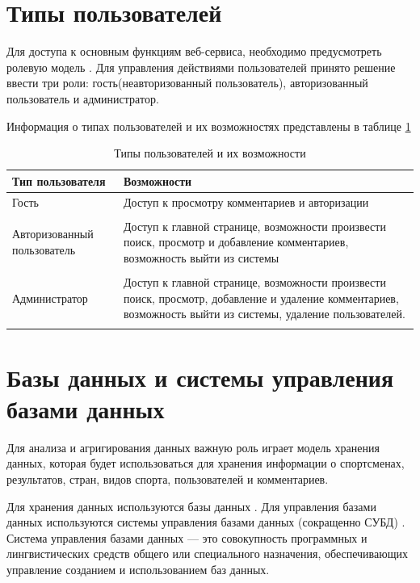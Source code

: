 \newpage
\section{Типы пользователей}

Для доступа к основным функциям веб-сервиса, необходимо предусмотреть ролевую модель \cite{role-m}.
Для управления действиями пользователей принято решение ввести три роли: гость(неавторизованный пользователь), авторизованный пользователь и администратор.


Информация о типах пользователей и их возможностях представлены в таблице \ref{tab:users}

\begin{table}[h!]
	\caption{Типы пользователей и их возможности}
	\label{tab:users}
	\begin{tabular}{ | p{150pt} | p{300pt}  | }
		\hline
	    Тип пользователя & Возможности   \\
	     \hline
		
		Гость & Доступ к просмотру комментариев и авторизации \\
		&   \\ \hline
		
		Авторизованный пользователь & Доступ к главной странице, возможности произвести поиск, просмотр и добавление комментариев, возможность выйти из системы  \\
		&   \\ \hline 
		
		
		Администратор & Доступ к главной странице, возможности произвести поиск, просмотр, добавление и удаление комментариев, возможность выйти из системы, удаление пользователей. \\
		&   \\ \hline
		
		
	\end{tabular}
\end{table}

\newpage

\section{Базы данных и системы управления базами данных}

Для анализа и агригирования данных важную роль играет модель хранения данных,
которая будет использоваться для хранения информации о спортсменах, 
результатов, стран, видов спорта, пользователей и комментариев.

Для хранения данных используются базы данных \cite{database}. Для управления базами данных используются 
системы управления базами данных (сокращенно СУБД) \cite{subd}. Система управления базами данных — 
это совокупность программных и лингвистических средств общего или специального назначения, 
обеспечивающих управление созданием и использованием баз данных.

